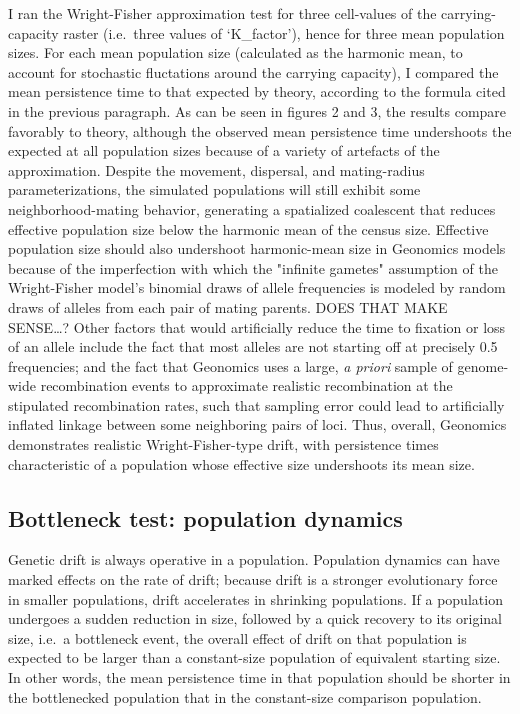 ﻿\documentclass{article}
\begin{document}
I ran the Wright-Fisher approximation test for three cell-values of the
carrying-capacity raster (i.e.\ three values of `K\_factor'), hence for three mean
population sizes. For each mean population size (calculated as the harmonic mean,
to account for stochastic fluctations around the carrying capacity), I compared
the mean persistence time to that
expected by theory, according to the formula cited in the previous paragraph. As can be
seen in figures 2 and 3, the results compare favorably to theory, although the observed
mean persistence time undershoots the expected at all population sizes because of a variety
of artefacts of the approximation. Despite the movement, dispersal, and mating-radius
parameterizations, the simulated populations will still exhibit some neighborhood-mating
behavior, generating a spatialized coalescent that reduces effective population size
below the harmonic mean of the census size. 
Effective population size should also undershoot harmonic-mean size in
Geonomics models because of the imperfection with which the "infinite gametes" assumption
of the Wright-Fisher model's binomial draws of allele frequencies is modeled by
random draws of alleles from each pair of mating parents. DOES THAT MAKE SENSE\ldots? Other
factors that would artificially reduce the time to fixation or loss of an allele include
the fact that most alleles are not starting off at precisely 0.5 frequencies; and the fact
that Geonomics uses a large, \emph{a priori} sample of genome-wide recombination events
to approximate realistic recombination at the stipulated recombination rates, such that
sampling error could lead to artificially inflated linkage between some neighboring pairs
of loci. Thus, overall, Geonomics demonstrates realistic Wright-Fisher-type drift, with
persistence times characteristic of a population whose effective size undershoots its
mean size.

\subsection{Bottleneck test: population dynamics}
Genetic drift is always operative in a population. Population dynamics can have
marked effects on the rate of drift; because drift is a stronger evolutionary
force in smaller populations, drift accelerates in shrinking populations. If a
population undergoes a sudden reduction in size, followed by a quick recovery to
its original size, i.e.\ a bottleneck event, the overall effect of drift on
that population is expected to be larger than a constant-size population of equivalent
starting size. In other words, the mean persistence time in that population
should be shorter in the bottlenecked population that in the constant-size comparison
population.
\end{document}
